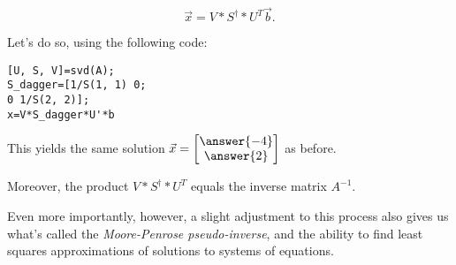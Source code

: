 \documentclass{ximera}
\begin{document}
\begin{example}
$$\vec{x}=V*S^\dagger*U^T\vec{b}.$$

Let's do so, using the following code:

\begin{verbatim}
[U, S, V]=svd(A);
S_dagger=[1/S(1, 1) 0;
0 1/S(2, 2)];
x=V*S_dagger*U'*b
\end{verbatim}

This yields the same solution $\vec{x}=\begin{bmatrix}
  \answer{-4}\\\answer{2}
\end{bmatrix}$ as before.

\end{example}

Moreover, the product $V*S^\dagger*U^T$ equals the inverse matrix $A^{-1}$. 

Even more importantly, however, a slight adjustment to this process also gives us what's called the \emph{Moore-Penrose pseudo-inverse}, and the ability to find least squares approximations of solutions to systems of equations. 
\end{document}
